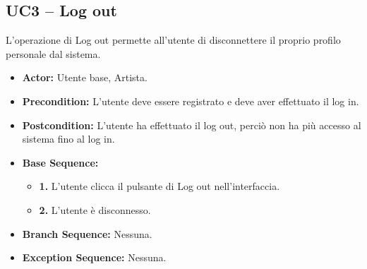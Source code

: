 \vspace{0.5cm}
\subsection{\textbf{UC3 -- Log out}}
L'operazione di Log out permette all'utente di disconnettere il 
proprio profilo personale dal sistema.
\begin{itemize}
    \item \textbf{Actor:} Utente base, Artista.
    \item \textbf{Precondition:} L'utente deve essere registrato e deve aver 
        effettuato il log in.
    \item \textbf{Postcondition:} L'utente ha effettuato il log out, perciò non ha più accesso al sistema fino al log in.
    \item \textbf{Base Sequence:}
    \begin{itemize}
        \item \textbf{1.} L'utente clicca il pulsante di Log out nell'interfaccia.
        \item \textbf{2.} L'utente è disconnesso.
    \end{itemize}
    \item \textbf{Branch Sequence:} Nessuna.
    \item \textbf{Exception Sequence:} Nessuna.

\end{itemize}


\vspace{1cm}
